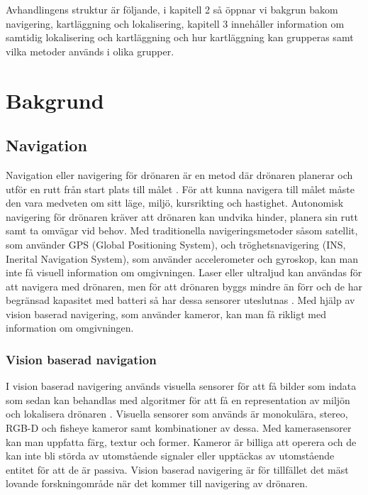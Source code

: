 Avhandlingens struktur är följande, i kapitell 2 så öppnar vi bakgrun bakom navigering, kartläggning och lokalisering, kapitell 3 innehåller information om samtidig lokalisering och kartläggning och hur kartläggning kan grupperas samt vilka metoder används i olika grupper. 

\chapter{Bakgrund}

\section{Navigation}

Navigation eller navigering för drönaren är en metod där drönaren planerar och utför en rutt från start plats till målet \citep{geospatial}. För att kunna navigera till målet måste den vara medveten om sitt läge, miljö, kursrikting och hastighet. Autonomisk navigering för drönaren kräver att drönaren kan undvika hinder, planera sin rutt samt ta omvägar vid behov. Med traditionella navigeringsmetoder såsom satellit, som använder GPS (Global Positioning System), och tröghetsnavigering (INS, Inerital Navigation System), som använder accelerometer och gyroskop, kan man inte få visuell information om omgivningen. Laser eller ultraljud kan användas för att navigera med drönaren, men för att drönaren byggs mindre än förr och de har begränsad kapasitet med batteri så har dessa sensorer uteslutnas \citep{6385934}. Med hjälp av vision baserad navigering, som använder kameror, kan man få rikligt med information om omgivningen. 

\subsection{Vision baserad navigation}

I vision baserad navigering används visuella sensorer för att få bilder som indata som sedan kan behandlas med algoritmer för att få en representation av miljön och lokalisera drönaren \citep{geospatial}. Visuella sensorer som används är monokulära, stereo, RGB-D och fisheye kameror samt kombinationer av dessa. Med kamerasensorer kan man uppfatta färg, textur och former. Kameror är billiga att operera och de kan inte bli störda av utomstående signaler eller upptäckas av utomstående entitet för att de är passiva. Vision baserad navigering är för tillfället det mäst lovande forskningområde när det kommer till navigering av drönaren.

